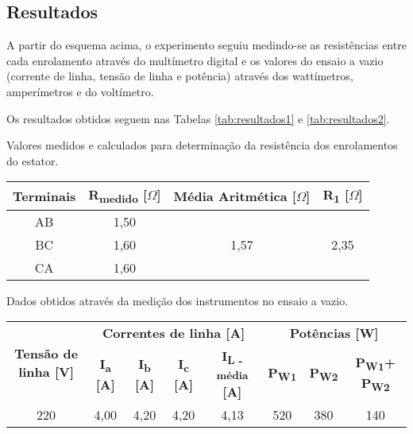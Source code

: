 \documentclass[a4paper,12pt,oneside]{article}
\begin{document}
\newpage
\subsection{Resultados}\hspace{0pt}

A partir do esquema acima, o experimento seguiu medindo-se as resistências entre cada enrolamento através do multímetro digital e os valores do ensaio a vazio (corrente de linha, tensão de linha e potência) através dos wattímetros, amperímetros e do voltímetro.

Os resultados obtidos seguem nas Tabelas \ref{tab:resultados1} e \ref{tab:resultados2}.

\begin{center}
\renewcommand{\arraystretch}{1.5}
\captionsetup{type=table}
\caption{Valores medidos e calculados para determinação da resistência dos enrolamentos do estator.}\vspace{2mm}
\begin{tabular}{c|c|c|c}\label{tab:resultados1}
\textbf{Terminais} & \textbf{R\textsubscript{medido} [$\Omega$]} & \textbf{Média Aritmética [$\Omega$]} & \textbf{R\textsubscript{1} [$\Omega$]}\\ \hline
AB & 1,50 & \multirow{3}{*}{1,57} & \multirow{3}{*}{2,35}\\ \cline{1-2}
BC & 1,60 & &\\ \cline{1-2}
CA & 1,60 & &
\end{tabular}
\end{center}


\begin{center}
\begin{footnotesize}
\renewcommand{\arraystretch}{1.5}
\captionsetup{type=table}
\caption{Dados obtidos através da medição dos instrumentos no ensaio a vazio.}\vspace{2mm}
\begin{tabular}{c|c|c|c|c|c|c|c}\label{tab:resultados2}
\multirow{2}{*}{\textbf{Tensão de linha [V]}} & \multicolumn{4}{c|}{\textbf{Correntes de linha [A]}} & \multicolumn{3}{c}{\textbf{Potências [W]}}\\ \cline{2-8}
& \textbf{I\textsubscript{a} [A]} & \textbf{I\textsubscript{b} [A]} & \textbf{I\textsubscript{c} [A]} & \textbf{I\textsubscript{L - média} [A]} & \textbf{P\textsubscript{W1}} & \textbf{P\textsubscript{W2}} & \textbf{P\textsubscript{W1}+ P\textsubscript{W2}}\\ \hline
220 & 4,00 & 4,20 & 4,20 & 4,13 & 520 & 380 & 140

\end{tabular}
\end{footnotesize}
\end{center}
\end{document}
